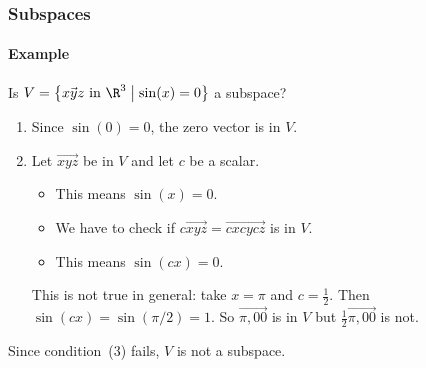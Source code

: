
\begin{frame}
\frametitle{Subspaces}
\framesubtitle{Example}

\vskip-3mm
\begin{eg}
  Is $V = \left\{ \vec{x y z} \text{ in }\R^3\bigm\vert \sin(x)=0 \right\}$ a subspace?
  \vskip1mm
  \begin{webonly}
  \begin{enumerate}
  \item Since $\sin(0) = 0$, the zero vector is in $V$.
    \setcounter{enumi}{2}
  \item Let $\vec{x y z}$ be in $V$ and let $c$ be a scalar.  
    \begin{itemize}
    \item This means $\sin(x)=0$.
    \item We have to check if
      $c\vec{x y z} = \vec{cx cy cz}$ is in $V$.
    \item This means $\sin(cx) = 0$.
    \end{itemize}
    This is not true in general: take
    $x = \pi$ and $c = \frac 12$.
    Then $\sin(cx) = \sin(\pi/2) = 1$.
    So $\vec{\pi, 0 0}$ is in $V$ but $\displaystyle\frac 12\vec{\pi, 0 0}$ is not.
  \end{enumerate}
  \end{webonly}

  \pause\medskip
  Since condition~(3) fails, $V$ is not a subspace.
\end{eg}

\end{frame}



